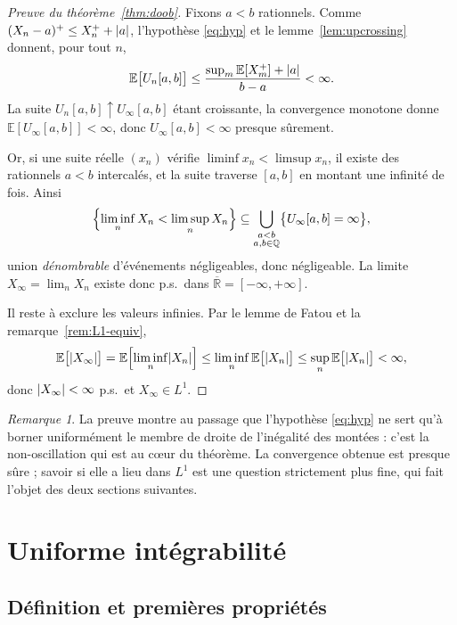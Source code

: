 \documentclass[11pt,a4paper]{article}
\theoremstyle{plain}
\theoremstyle{definition}
\theoremstyle{remark}
\newtheorem{remark}[theorem]{Remarque}
\newcommand{\E}{\mathbb{E}}
\newcommand{\R}{\mathbb{R}}
\newcommand{\Q}{\mathbb{Q}}
\DeclarePairedDelimiter{\abs}{\lvert}{\rvert}
\begin{document}
\begin{proof}[Preuve du théorème~\ref{thm:doob}]
Fixons $a < b$ rationnels. Comme $(X_n - a)^+ \le X_n^+ + \abs{a}$, l'hypothèse
\eqref{eq:hyp} et le lemme~\ref{lem:upcrossing} donnent, pour tout $n$,
\[
\E\bigl[U_n[a,b]\bigr] \le \frac{\sup_m \E[X_m^+] + \abs{a}}{b-a} < \infty.
\]
La suite $U_n[a,b] \uparrow U_\infty[a,b]$ étant croissante, la convergence
monotone donne $\E[U_\infty[a,b]] < \infty$, donc
$U_\infty[a,b] < \infty$ presque sûrement.

Or, si une suite réelle $(x_n)$ vérifie $\liminf x_n < \limsup x_n$, il existe
des rationnels $a < b$ intercalés, et la suite traverse $[a,b]$ en montant une
infinité de fois. Ainsi
\[
\Bigl\{\liminf_n X_n < \limsup_n X_n\Bigr\}
\subseteq \bigcup_{\substack{a<b \\ a,b \in \Q}} \bigl\{U_\infty[a,b] = \infty\bigr\},
\]
union \emph{dénombrable} d'événements négligeables, donc négligeable. La limite
$X_\infty = \lim_n X_n$ existe donc p.s.\ dans $\overline{\R} = [-\infty,
+\infty]$.

Il reste à exclure les valeurs infinies. Par le lemme de Fatou et la
remarque~\ref{rem:L1-equiv},
\[
\E\bigl[\abs{X_\infty}\bigr]
= \E\Bigl[\liminf_n \abs{X_n}\Bigr]
\le \liminf_n \E\bigl[\abs{X_n}\bigr]
\le \sup_n \E\bigl[\abs{X_n}\bigr] < \infty,
\]
donc $\abs{X_\infty} < \infty$ p.s.\ et $X_\infty \in L^1$.
\end{proof}

\begin{remark}
La preuve montre au passage que l'hypothèse \eqref{eq:hyp} ne sert qu'à borner
uniformément le membre de droite de l'inégalité des montées : c'est la
non-oscillation qui est au c\oe ur du théorème. La convergence obtenue est
presque sûre ; savoir si elle a lieu dans $L^1$ est une question strictement
plus fine, qui fait l'objet des deux sections suivantes.
\end{remark}

\section{Uniforme intégrabilité}

\subsection{Définition et premières propriétés}
\end{document}
